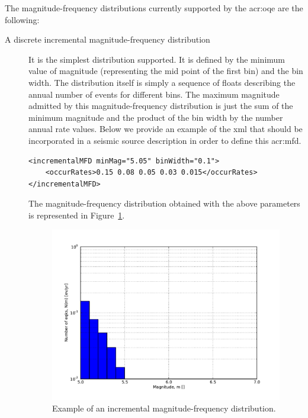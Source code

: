 The magnitude-frequency distributions currently supported by the
\gls{acr:oqe} are the following:

\begin{description}


\item[A discrete incremental magnitude-frequency distribution]

It is the simplest distribution supported. It is defined by the minimum value
of magnitude (representing the mid point of the first bin) and the bin width.
The distribution itself is simply a sequence of floats describing the annual
number of events for different bins. The maximum magnitude admitted by this
magnitude-frequency distribution is just the sum of the minimum magnitude and
the product of the bin width by the number annual rate values. Below we provide an example of the xml that should be incorporated in a
seismic source description in order to define this \gls{acr:mfd}.


\begin{verbatim}
<incrementalMFD minMag="5.05" binWidth="0.1">
    <occurRates>0.15 0.08 0.05 0.03 0.015</occurRates>
</incrementalMFD>
\end{verbatim}


The magnitude-frequency distribution obtained with the above parameters is represented in Figure~\ref{fig:evenly_discretized_mfd}.

\begin{figure}[!ht]
\centering
\includegraphics[width=12cm]{figures/hazard/ed_mfd.pdf}
\caption{Example of an incremental magnitude-frequency distribution.}
\label{fig:evenly_discretized_mfd}
\end{figure}


\end{description}
